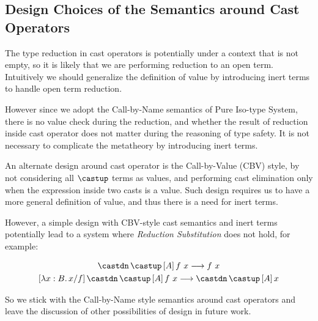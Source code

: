 \begin{comment}
\begin{equation*}
    F : [[int]] \rightarrow [[*]],\, A : [[*]],\, \rulehl{a : A} \vdash F ~ ([[(bind x : A. lambda y : int. y)]]~ 42) : [[*]]
\end{equation*}

For the time being, we think the addition of the premise in \rref{s-forall-r} and
the addition of \rref{s-forall} do not complicate the metatheory as much, so
we leave the further exploration of the issue above in future work.
\end{comment}

\subsection{Design Choices of the Semantics around Cast Operators}
\label{sec:cast-design}

The type reduction in cast operators is potentially under a context that
is not empty, so it is likely that we are performing reduction to an open term.
Intuitively we should generalize the definition of value by introducing inert
terms\cite{yang2017unifying} to handle open term reduction.

However since we adopt the Call-by-Name semantics of Pure Iso-type System\cite{yang2019pure},
there is no value check during the reduction, and whether the result of reduction
inside cast operator does not matter during the reasoning of type safety. It is
not necessary to complicate the metatheory by introducing inert terms.

An alternate design around cast operator is the Call-by-Value (CBV) style\cite{yang2019pure},
by not considering all $\castup$ terms as values, and performing cast elimination only
when the expression inside two casts is a value. Such design requires us to
have a more general definition of value, and thus there is a need for inert terms.

However, a simple design with CBV-style cast semantics and inert terms
potentially lead to a system where \emph{Reduction Substitution} does not hold,
for example:

\begin{gather*}
    \castdn \, \castup \, [A] \, f ~ x \longrightarrow f ~ x \\
    [\lambda x : B. \, x / f] \, \castdn \, \castup \, [A] \, f ~ x \longrightarrow \castdn \, \castup \, [A] \, x
\end{gather*}

So we stick with the Call-by-Name style semantics around cast operators and
leave the discussion of other possibilities of design in future work.

